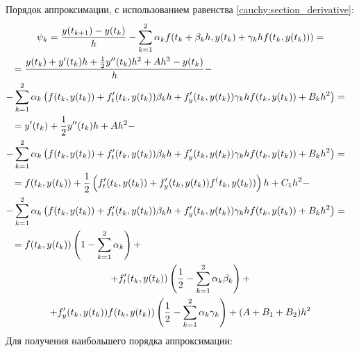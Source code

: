 \documentclass[a4paper,12pt]{article}
\begin{document}
Порядок аппроксимации, с использованием равенства \eqref{cauchy:section_derivative}:
\begin{multline*}
    \psi_k = \frac{y(t_{k+1}) - y(t_k)}{h} - \sum_{k=1}^2 \alpha_k f(t_k + \beta_k h, y(t_k) + \gamma_k h f(t_k,y(t_k))) = \\
    \shoveleft{= \frac{y(t_k) + y^\prime(t_k) h + \frac{1}{2} y^{\prime\prime}(t_k) h^2 + A h^3 - y(t_k)}{h} -} \\
    \shoveright{ - \sum_{k=1}^2 \alpha_k \left( f(t_k, y(t_k)) + f_t^\prime(t_k, y(t_k)) \beta_k h + f_y^\prime(t_k, y(t_k)) \gamma_k h f(t_k,y(t_k)) + B_k h^2 \right) = } \\
    \shoveleft{= y^\prime(t_k) + \frac{1}{2} y^{\prime\prime}(t_k) h + A h^2 -} \\
    \shoveright{ - \sum_{k=1}^2 \alpha_k \left( f(t_k, y(t_k)) + f_t^\prime(t_k, y(t_k)) \beta_k h + f_y^\prime(t_k, y(t_k)) \gamma_k h f(t_k,y(t_k)) + B_k h^2 \right) = } \\
    \shoveleft{= f(t_k, y(t_k)) + \frac{1}{2} \left( f_t^\prime(t_k, y(t_k)) + f_y^\prime(t_k, y(t_k)) f^(t_k, y(t_k)) \right) h + C_1 h^2 -} \\
    \shoveright{ - \sum_{k=1}^2 \alpha_k \left( f(t_k, y(t_k)) + f_t^\prime(t_k, y(t_k)) \beta_k h + f_y^\prime(t_k, y(t_k)) \gamma_k h f(t_k,y(t_k)) + B_k h^2 \right) = } \\
    \shoveleft{= f(t_k, y(t_k)) \left( 1 - \sum_{k=1}^2 \alpha_k \right ) + } \\
    + f_t^\prime(t_k, y(t_k)) \left( \frac{1}{2} - \sum_{k=1}^2 \alpha_k \beta_k \right) + \\
    + f_y^\prime(t_k, y(t_k)) f(t_k,y(t_k)) \left( \frac{1}{2} - \sum_{k=1}^2 \alpha_k \gamma_k \right)
    + ( A + B_1 + B_2 ) h^2
\end{multline*}
Для получения наибольшего порядка аппроксимации:
\begin{align*}
\end{align*}
\end{document}
